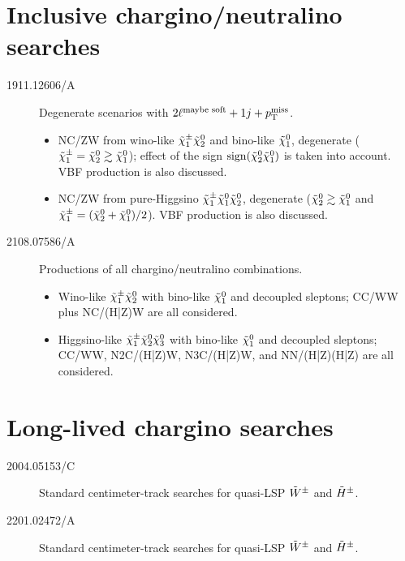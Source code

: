 \section[Inclusive ino searches]{Inclusive chargino/neutralino searches}
\begin{description}
\item[1911.12606/A] Degenerate scenarios with $2\ell\wup*{maybe soft}+1j+\mpT$.
\begin{itemize}
 \item NC/ZW from wino-like $\charPM[1]\neut[2]$ and bino-like $\neut[1]$, degenerate ($\charPM[1]=\neut[2]\gtrsim\neut[1]$); effect of the sign $\sign(\neut[2]\neut[1])$ is taken into account. VBF production is also discussed.
 \item NC/ZW from pure-Higgsino $\charPM[1]\neut[1]\neut[2]$, degenerate ($\neut[2]\gtrsim\neut[1]$ and $\charPM[1]=(\neut[2]+\neut[1])/2$). VBF production is also discussed.
\end{itemize}
\item[2108.07586/A] Productions of all chargino/neutralino combinations.
\begin{itemize}
 \item Wino-like $\charPM[1]\neut[2]$ with bino-like $\neut[1]$ and decoupled sleptons; CC/WW plus NC/(H|Z)W are all considered.
 \item Higgsino-like $\charPM[1]\neut[2]\neut[3]$ with bino-like $\neut[1]$ and decoupled sleptons; CC/WW, N2C/(H|Z)W, N3C/(H|Z)W, and NN/(H|Z)(H|Z) are all considered.
\end{itemize}
\end{description}


\section[Long-lived chargino searches]{Long-lived chargino searches}
\begin{description}
\item[2004.05153/C] Standard centimeter-track searches for quasi-LSP $\winoPM$ and $\hinoPM$.
\item[2201.02472/A] Standard centimeter-track searches for quasi-LSP $\winoPM$ and $\hinoPM$.
\end{description}









